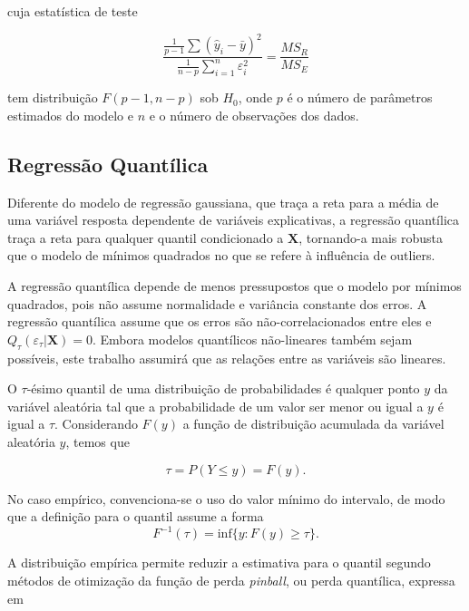 \noindent cuja estatística de teste

\begin{equation}
\frac{\frac{1}{p-1} \sum(\hat{y}_i - \bar{y})^2}{\frac{1}{n-p}\displaystyle \sum_{i=1}^n \varepsilon_i^2} = \frac{MS_R}{MS_E}
\end{equation}

\noindent tem distribuição $F(p-1, n-p)$ sob $H_0$, onde $p$ é o número de parâmetros estimados do modelo e $n$ e o número de observações dos dados.

\subsection{Regressão Quantílica}
Diferente do modelo de regressão gaussiana, que traça a reta para a média de uma variável resposta dependente de variáveis explicativas, a regressão quantílica traça a reta para qualquer quantil condicionado a $\mathbf{X}$, tornando-a mais robusta que o modelo de mínimos quadrados no que se refere à influência de outliers.

A regressão quantílica depende de menos pressupostos que o modelo por mínimos quadrados, pois não assume normalidade e variância constante dos erros. A regressão quantílica assume que os erros são não-correlacionados entre eles e $Q_\tau(\varepsilon_\tau | \mathbf{X}) = 0$. Embora modelos quantílicos não-lineares também sejam possíveis, este trabalho assumirá que as relações entre as variáveis são lineares.

O $\tau$-ésimo quantil de uma distribuição de probabilidades é qualquer ponto $y$ da variável aleatória tal que a probabilidade de um valor ser menor ou igual a $y$ é igual a $\tau$. Considerando $F(y)$ a função de distribuição acumulada da variável aleatória $y$, temos que

\begin{equation}
\tau = P(Y \leq y) = F(y).
\end{equation}

No caso empírico, convenciona-se o uso do valor mínimo do intervalo, de modo que a definição para o quantil assume a forma
\begin{equation}
F^{-1}(\tau) = \text{inf}\{y: F(y) \geq \tau\}.
\label{empirical_quantile}
\end{equation}

A distribuição empírica permite reduzir a estimativa para o quantil segundo métodos de otimização da função de perda \textit{pinball}, ou perda quantílica, expressa em

